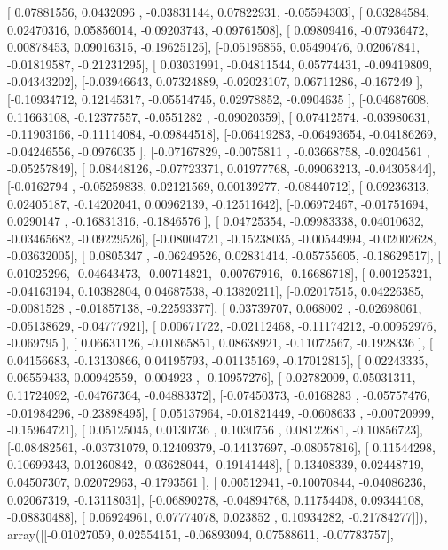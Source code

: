 \documentclass{article}
\begin{document}
       [ 0.07881556,  0.0432096 , -0.03831144,  0.07822931, -0.05594303],
       [ 0.03284584,  0.02470316,  0.05856014, -0.09203743, -0.09761508],
       [ 0.09809416, -0.07936472,  0.00878453,  0.09016315, -0.19625125],
       [-0.05195855,  0.05490476,  0.02067841, -0.01819587, -0.21231295],
       [ 0.03031991, -0.04811544,  0.05774431, -0.09419809, -0.04343202],
       [-0.03946643,  0.07324889, -0.02023107,  0.06711286, -0.167249  ],
       [-0.10934712,  0.12145317, -0.05514745,  0.02978852, -0.0904635 ],
       [-0.04687608,  0.11663108, -0.12377557, -0.0551282 , -0.09020359],
       [ 0.07412574, -0.03980631, -0.11903166, -0.11114084, -0.09844518],
       [-0.06419283, -0.06493654, -0.04186269, -0.04246556, -0.0976035 ],
       [-0.07167829, -0.0075811 , -0.03668758, -0.0204561 , -0.05257849],
       [ 0.08448126, -0.07723371,  0.01977768, -0.09063213, -0.04305844],
       [-0.0162794 , -0.05259838,  0.02121569,  0.00139277, -0.08440712],
       [ 0.09236313,  0.02405187, -0.14202041,  0.00962139, -0.12511642],
       [-0.06972467, -0.01751694,  0.0290147 , -0.16831316, -0.1846576 ],
       [ 0.04725354, -0.09983338,  0.04010632, -0.03465682, -0.09229526],
       [-0.08004721, -0.15238035, -0.00544994, -0.02002628, -0.03632005],
       [ 0.0805347 , -0.06249526,  0.02831414, -0.05755605, -0.18629517],
       [ 0.01025296, -0.04643473, -0.00714821, -0.00767916, -0.16686718],
       [-0.00125321, -0.04163194,  0.10382804,  0.04687538, -0.13820211],
       [-0.02017515,  0.04226385, -0.0081528 , -0.01857138, -0.22593377],
       [ 0.03739707,  0.068002  , -0.02698061, -0.05138629, -0.04777921],
       [ 0.00671722, -0.02112468, -0.11174212, -0.00952976, -0.069795  ],
       [ 0.06631126, -0.01865851,  0.08638921, -0.11072567, -0.1928336 ],
       [ 0.04156683, -0.13130866,  0.04195793, -0.01135169, -0.17012815],
       [ 0.02243335,  0.06559433,  0.00942559, -0.004923  , -0.10957276],
       [-0.02782009,  0.05031311,  0.11724092, -0.04767364, -0.04883372],
       [-0.07450373, -0.0168283 , -0.05757476, -0.01984296, -0.23898495],
       [ 0.05137964, -0.01821449, -0.0608633 , -0.00720999, -0.15964721],
       [ 0.05125045,  0.0130736 ,  0.1030756 ,  0.08122681, -0.10856723],
       [-0.08482561, -0.03731079,  0.12409379, -0.14137697, -0.08057816],
       [ 0.11544298,  0.10699343,  0.01260842, -0.03628044, -0.19141448],
       [ 0.13408339,  0.02448719,  0.04507307,  0.02072963, -0.1793561 ],
       [ 0.00512941, -0.10070844, -0.04086236,  0.02067319, -0.13118031],
       [-0.06890278, -0.04894768,  0.11754408,  0.09344108, -0.08830488],
       [ 0.06924961,  0.07774078,  0.023852  ,  0.10934282, -0.21784277]]), array([[-0.01027059,  0.02554151, -0.06893094,  0.07588611, -0.07783757],
\end{document}
